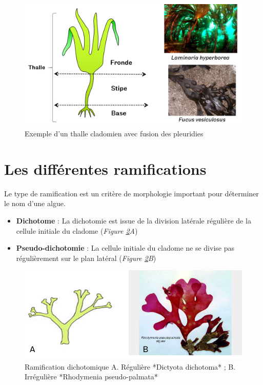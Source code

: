 \documentclass[
]{book}
\begin{document}
\begin{figure}[H]

{\centering \includegraphics[width=0.7\linewidth]{./images/thalle_fucoide} 

}

\caption{Exemple d'un thalle cladomien avec fusion des pleuridies}\label{fig:thallefucoide}
\end{figure}

\hypertarget{les-diffuxe9rentes-ramifications}{%
\section{Les différentes ramifications}\label{les-diffuxe9rentes-ramifications}}

Le type de ramification est un critère de morphologie important pour déterminer le nom d'une algue.

\begin{itemize}
\item
  \textbf{Dichotome} : La dichotomie est issue de la division latérale régulière de la cellule initiale du cladome (\emph{Figure \ref{fig:dicho}A})
\item
  \textbf{Pseudo-dichotomie} : La cellule initiale du cladome ne se divise pas régulièrement sur le plan latéral (\emph{Figure \ref{fig:dicho}B})
\end{itemize}

\begin{figure}[H]

{\centering \includegraphics[width=0.7\linewidth]{./images/dichotomie} 

}

\caption{Ramification dichotomique A. Régulière *Dictyota dichotoma* ; B. Irrégulière *Rhodymenia pseudo-palmata*}\label{fig:dicho}
\end{figure}
\end{document}
